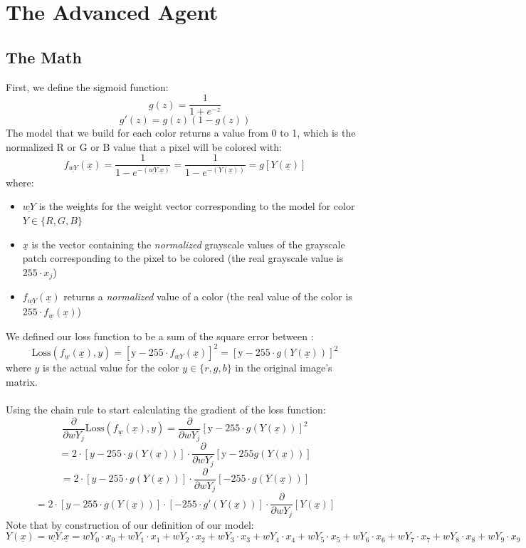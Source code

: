 \documentclass[11pt]{article}
\begin{document}
\section{The Advanced Agent}
\subsection{The Math}
First, we define the sigmoid function:
\[
g(z) = \frac{1}{1+e^{-z}}
\]
\[
g'(z) = g(z)(1-g(z))
\]
The model that we build for each color returns a value from 0 to 1, which is the normalized R or G or B value that a pixel will be colored with:
\[
f_{\underline{wY}}(\underline{x}) = \frac{1}{1 - e^{-(\underline{wY}. \underline{x})}} = \frac{1}{1 - e^{-(Y(\underline{x}))}} = g[Y(\underline{x})]
\]
where:
\begin{itemize}
\item $\underline{wY}$ is the weights for the weight vector corresponding to the model for color $Y \in \{R, G, B\}$
\item $\underline{x}$ is the vector containing the \textit{normalized }grayscale values of the grayscale patch corresponding to the pixel to be colored (the real grayscale value is $255\cdot x_j$)
\item $f_{\underline{wY}}(\underline{x})$ returns a \textit{normalized} value of a color (the real value of the color is $255\cdot f_{\underline{w}}(\underline{x})$)
\end{itemize}
We defined our loss function to be a sum of the square error between :
\[
\text{Loss}(f_{\underline{w}}(\underline{x}),y) = [\text{y} - 255\cdot f_{\underline{wY}}(\underline{x})]^2 = [\text{y} - 255\cdot g(Y(\underline{x}))]^2
\]
where $y$ is the actual value for the color $y \in \{r, g, b\}$ in the original image's matrix.\\\\
Using the chain rule to start calculating the gradient of the loss function:
\[
\frac{\partial}{\partial wY_j}\text{Loss}(f_{\underline{w}}(\underline{x}),y) = \frac{\partial}{\partial wY_j}\left[\text{y} - 255\cdot g(Y(\underline{x}))\right]^2
\]
\[
= 2\cdot[y - 255\cdot g(Y(\underline{x}))]\cdot\frac{\partial}{\partial wY_j}[\text{y} - 255g(Y(\underline{x}))]
\]
\[
= 2\cdot\left[y - 255\cdot g(Y(\underline{x}))\right]\cdot\frac{\partial}{\partial wY_j}[-255\cdot g(Y(\underline{x}))] 
\]
\[
=  2\cdot[y - 255\cdot g(Y(\underline{x}))]\cdot[-255\cdot g'(Y(\underline{x}))]\cdot\frac{\partial}{\partial wY_j}[Y(\underline{x})]
\]
Note that by construction of our definition of our model:
\[
Y(\underline{x}) = \underline{wY}.\underline{x} = wY_0\cdot x_0 + wY_1\cdot x_1 + wY_2\cdot x_2 + wY_3\cdot x_3 + wY_4\cdot x_4 + wY_5\cdot x_5 + wY_6\cdot x_6 + wY_7\cdot x_7 + wY_8\cdot x_8 + wY_9\cdot x_9
\]
\end{document}
